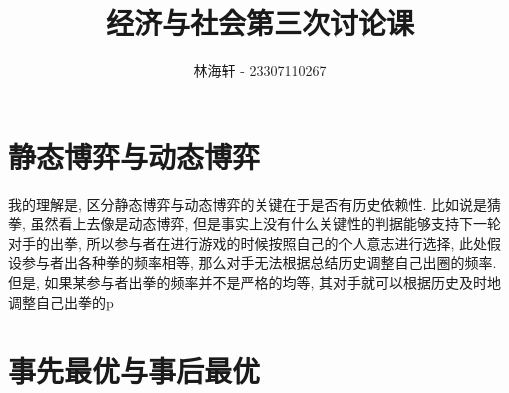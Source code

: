 \documentclass[a4paper,11pt]{amsart}
\title{经济与社会第三次讨论课}
\author{林海轩 - 23307110267}
\theoremstyle{definition}
\begin{document}
	
	\maketitle
	\section*{静态博弈与动态博弈}
	我的理解是, 区分静态博弈与动态博弈的关键在于是否有历史依赖性. 比如说是猜拳, 虽然看上去像是动态博弈, 但是事实上没有什么关键性的判据能够支持下一轮对手的出拳, 所以参与者在进行游戏的时候按照自己的个人意志进行选择, 此处假设参与者出各种拳的频率相等, 那么对手无法根据总结历史调整自己出圈的频率. 但是, 如果某参与者出拳的频率并不是严格的均等, 其对手就可以根据历史及时地调整自己出拳的p
    \section*{事先最优与事后最优}
    
\end{document}
